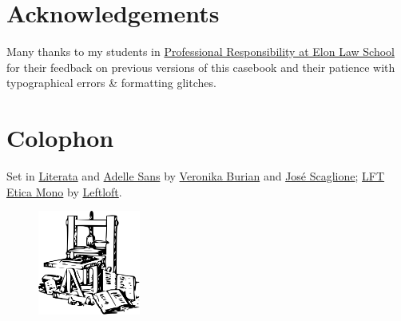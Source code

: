 \pagestyle{plain.scrheadings}

\chapter*{Acknowledgements}

Many thanks to my students in \href{https://www.emfink.net/PR/}{Professional Responsibility at Elon Law School} for their feedback on previous versions of this casebook and their patience with typographical errors \& formatting glitches. 


\chapter*{Colophon}

\raggedright{Set in \href{https://www.type-together.com/literata-font/}{Literata} and \href{https://www.type-together.com/adelle-sans-font/}{Adelle Sans} by \href{https://www.type-together.com/veronika-burian/}{Veronika Burian} and \href{https://www.type-together.com/jose-scaglione/}{José Scaglione}; \href{https://www.type-together.com/lft-etica-mono-font/}{LFT Etica Mono} by \href{https://www.type-together.com/leftloft/}{Leftloft}.}

\begin{figure}[h!]
\centering
\includegraphics[width=0.3\textwidth]{../img/gutenberg_press.png}
\end{figure}